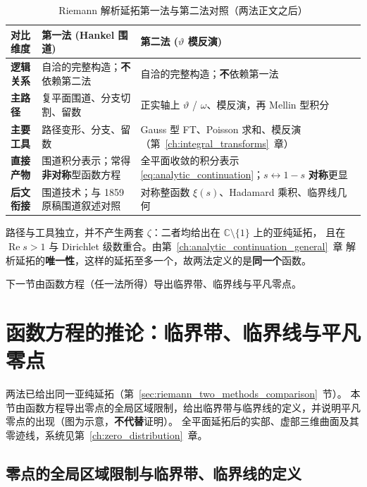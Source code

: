 \begin{table}[htbp]
\centering
\begin{tabular}{p{2.2cm}|p{5.0cm}|p{5.0cm}}
\hline
\textbf{对比维度} & \textbf{第一法 (Hankel 围道)} & \textbf{第二法 ($\vartheta$ 模反演)} \\ \hline
\textbf{逻辑关系} & 自洽的完整构造；\textbf{不}依赖第二法
  & 自洽的完整构造；\textbf{不}依赖第一法 \\ \hline
\textbf{主路径} & 复平面围道、分支切割、留数
  & 正实轴上 $\vartheta$ / $\omega$、模反演，再 Mellin 型积分 \\ \hline
\textbf{主要工具} & 路径变形、分支、留数
  & Gauss 型 FT、Poisson 求和、模反演（第~\ref{ch:integral_transforms}~章） \\ \hline
\textbf{直接产物} & 围道积分表示；常得\textbf{非对称}型函数方程
  & 全平面收敛的积分表示 \eqref{eq:analytic_continuation}；$s\leftrightarrow 1-s$ \textbf{对称}更显 \\ \hline
\textbf{后文衔接} & 围道技术；与 1859 原稿围道叙述对照
  & 对称整函数 $\xi(s)$、Hadamard 乘积、临界线几何 \\ \hline
\end{tabular}
\caption{Riemann 解析延拓第一法与第二法对照（两法正文之后）}
\label{tab:riemann_methods_comparison}
\end{table}

路径与工具独立，并不产生两套 $\zeta$：二者均给出在 $\mathbb{C}\setminus\{1\}$ 上的亚纯延拓，
且在 $\operatorname{Re}s>1$ 与 Dirichlet 级数重合。由第~\ref{ch:analytic_continuation_general}~章
解析延拓的\textbf{唯一性}，这样的延拓至多一个，故两法定义的是\textbf{同一个}函数。

下一节由函数方程（任一法所得）导出临界带、临界线与平凡零点。

\section{函数方程的推论：临界带、临界线与平凡零点}
\label{sec:fe_geometry_trivial_zeros}

两法已给出同一亚纯延拓（第~\ref{sec:riemann_two_methods_comparison}~节）。
本节由函数方程导出零点的全局区域限制，给出临界带与临界线的定义，并说明平凡零点的出现（图为示意，\textbf{不代替}证明）。
全平面延拓后的实部、虚部三维曲面及其零迹线，系统见第~\ref{ch:zero_distribution}~章。

\subsection{零点的全局区域限制与临界带、临界线的定义}
\label{sec:critical_strip_from_fe}

